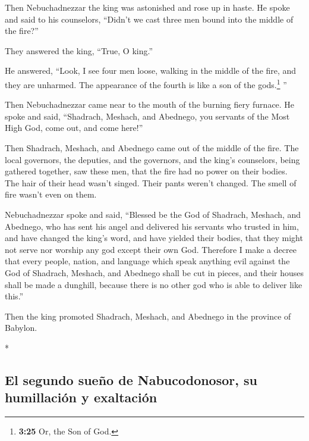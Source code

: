 \begin{paracol}{2}
\begin{otherlanguage}{english}
 Then Nebuchadnezzar the king was astonished and rose up
in haste. He spoke and said to his counselors, ``Didn't we cast three
men bound into the middle of the fire?''

They answered the king, ``True, O king.''

 He answered, ``Look, I see four men loose, walking in
the middle of the fire, and they are unharmed. The appearance of the
fourth is like a son of the gods.\footnote{\textbf{3:25} Or, the Son of
  God.} ''

 Then Nebuchadnezzar came near to the mouth of the
burning fiery furnace. He spoke and said, ``Shadrach, Meshach, and
Abednego, you servants of the Most High God, come out, and come here!''

Then Shadrach, Meshach, and Abednego came out of the middle of the fire.
 The local governors, the deputies, and the governors,
and the king's counselors, being gathered together, saw these men, that
the fire had no power on their bodies. The hair of their head wasn't
singed. Their pants weren't changed. The smell of fire wasn't even on
them.

 Nebuchadnezzar spoke and said, ``Blessed be the God of
Shadrach, Meshach, and Abednego, who has sent his angel and delivered
his servants who trusted in him, and have changed the king's word, and
have yielded their bodies, that they might not serve nor worship any god
except their own God.  Therefore I make a decree that
every people, nation, and language which speak anything evil against the
God of Shadrach, Meshach, and Abednego shall be cut in pieces, and their
houses shall be made a dunghill, because there is no other god who is
able to deliver like this.''

 Then the king promoted Shadrach, Meshach, and Abednego
in the province of Babylon.

\end{otherlanguage}

\switchcolumn[0]*

\hypertarget{el-segundo-sueuxf1o-de-nabucodonosor-su-humillaciuxf3n-y-exaltaciuxf3n}{%
\subsection{El segundo sueño de Nabucodonosor, su humillación y
exaltación}\label{el-segundo-sueuxf1o-de-nabucodonosor-su-humillaciuxf3n-y-exaltaciuxf3n}}


\end{paracol}
